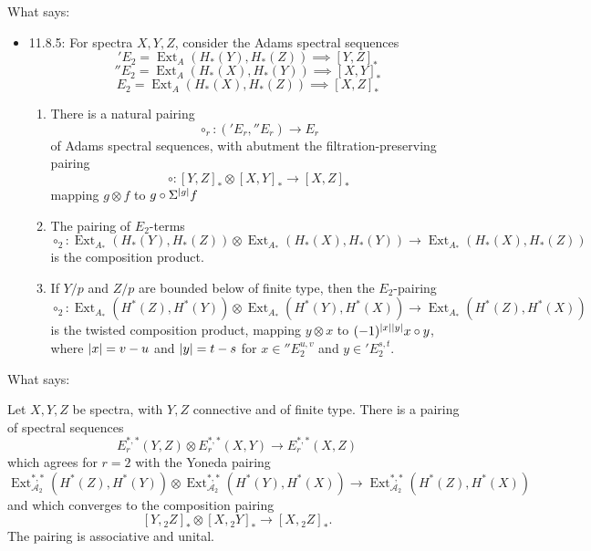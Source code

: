 \documentclass{MetricNotes2023}
\def\A{\ensuremath{\mathscr{A}_2}}
\DeclareMathOperator{\Ext}{Ext}
\begin{document}
What \autocite{rognes2} says:
\begin{itemize}
\item 11.8.5: For spectra \(X, Y, Z\), consider the Adams spectral sequences
\['E_2 = \Ext_A(H_*(Y), H_*(Z))\implies [Y,Z]_*\]
\[''E_2 = \Ext_A(H_*(X), H_*(Y))\implies [X,Y]_*\]
\[E_2 = \Ext_A(H_*(X), H_*(Z))\implies [X,Z]_*\] \begin{enumerate}
\item There is a natural pairing 
\[\circ_r : ('E_r, ''E_r)\to E_r\]
of Adams spectral sequences, with abutment the filtration-preserving pairing
\[\circ : [Y, Z]_* \otimes [X,Y]_* \to [X,Z]_*\]
mapping \(g \otimes f\) to \(g \circ \Sigma^{\lvert g\rvert}f\)

\item The pairing of \(E_2\)-terms 
\[\circ_2 : \Ext_{A_*}(H_*(Y), H_*(Z))\otimes \Ext_{A_*}(H_*(X), H_*(Y))\to \Ext_{A_*}(H_*(X), H_*(Z))\]
is the composition product.

\item If \(Y/p\) and \(Z/p\) are bounded below of finite type, then the \(E_2\)-pairing 
\[\circ_2 : \Ext_{A_*}(H^*(Z), H^*(Y))\otimes \Ext_{A_*}(H^*(Y), H^*(X))\to \Ext_{A_*}(H^*(Z), H^*(X))\]
is the twisted composition product, mapping \(y\otimes x\) to \((-1)^{\lvert x\rvert\lvert y\rvert}x\circ y\), where \(\lvert x\rvert=v-u\) and \(\lvert y\rvert=t-s\) for \(x\in \text{}''E_2^{u,v}\) and \(y \in \text{}'E^{s,t}_2\).
\end{enumerate}
\end{itemize}

What \autocite{ass} says:

\begin{theorem}
Let \(X,Y,Z\) be spectra, with \(Y, Z\) connective and of finite type. There is a pairing of spectral sequences
\[E^{*,*}_r(Y,Z)\otimes E^{*,*}_r(X,Y)\to E^{*,*}_r(X,Z)\]
which agrees for \(r=2\) with the Yoneda pairing
\[\Ext^{*,*}_{\A}(H^*(Z), H^*(Y))\otimes \Ext_{\A}^{*,*}(H^*(Y), H^*(X))\to \Ext_{\A}^{*,*}(H^*(Z), H^*(X))\]
and which converges %
to the composition pairing
\[[Y, \text{}_2Z]_*\otimes [X,\text{}_2Y]_* \to [X, \text{}_2Z]_*.\]
The pairing is associative and unital.
\end{theorem}
\end{document}
